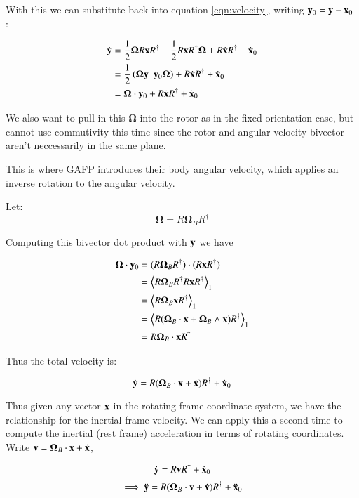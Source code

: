 \documentclass{article}      %
\newcommand{\dt}[1]{\dot{#1}}
\newcommand{\ddt}[1]{\ddot{#1}}
\newcommand{\gpgradeone}[1] {{\left\langle{{#1}}\right\rangle}_{1}}
\newcommand{\BOmega}[0]{\boldsymbol{\Omega}}
\begin{document}
With this we can substitute back into equation \ref{eqn:velocity}, writing $\mathbf{y}_0 = \mathbf{y} - \mathbf{x}_0$ :

\begin{align*}
\dt{\By}
&= \inv{2} \BOmega {R} \Bx R^\dagger - \inv{2} R \Bx {R^\dagger} \BOmega +R \dt{\Bx} R^\dagger + \dt{\Bx}_0 \\
&= \inv{2}\left(\BOmega \By_ - \By_0 \BOmega\right) +R \dt{\Bx} R^\dagger + \dt{\Bx}_0 \\
&= \BOmega \cdot \By_0 +R \dt{\Bx} R^\dagger + \dt{\Bx}_0 \\
\end{align*}

We also want to pull in this $\BOmega$ into the rotor as in the fixed orientation
case, but cannot use commutivity this time since the rotor and angular velocity bivector aren't neccessarily in the same plane.

This is where GAFP introduces their body angular velocity, which applies an inverse rotation to the angular velocity.

Let:
\[
\BOmega = R \BOmega_B R^\dagger
\]

Computing this bivector dot product with $\mathbf{y}$ we have

\begin{align*}
\BOmega \cdot \By_0
&= (R \BOmega_B R^\dagger) \cdot (R \Bx R^\dagger) \\
&= \gpgradeone{R \BOmega_B R^\dagger R \Bx R^\dagger} \\
&= \gpgradeone{R \BOmega_B \Bx R^\dagger} \\
&= \gpgradeone{R (\BOmega_B \cdot \Bx + \BOmega_B \wedge \Bx) R^\dagger} \\
&= {R \BOmega_B \cdot \Bx R^\dagger} \\
\end{align*}

Thus the total velocity is:

\begin{equation}
\dt{\By} = {R (\BOmega_B \cdot \Bx + \dt{\Bx} )R^\dagger} + \dt{\Bx}_0
\end{equation}

Thus given any vector $\mathbf{x}$ in the rotating frame coordinate system, we have the relationship for the inertial frame velocity.  We can apply this a second
time to compute the inertial (rest frame) acceleration in terms of rotating coordinates.  Write $\Bv = \BOmega_B \cdot \Bx + \dt{\Bx}$, 

\begin{equation*}
\dt{\By} = {R \Bv R^\dagger} + \dt{\Bx}_0
\end{equation*}
\begin{equation*}
\implies
\ddt{\By} = {R (\BOmega_B \cdot \Bv + \dt{\Bv} ) R^\dagger} + \ddt{\Bx}_0
\end{equation*}
\end{document}
